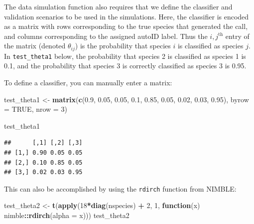 \documentclass[
]{article}
\newenvironment{Shaded}{\begin{snugshade}}{\end{snugshade}}
\newcommand{\AttributeTok}[1]{\textcolor[rgb]{0.13,0.29,0.53}{#1}}
\newcommand{\ConstantTok}[1]{\textcolor[rgb]{0.56,0.35,0.01}{#1}}
\newcommand{\ControlFlowTok}[1]{\textcolor[rgb]{0.13,0.29,0.53}{\textbf{#1}}}
\newcommand{\DecValTok}[1]{\textcolor[rgb]{0.00,0.00,0.81}{#1}}
\newcommand{\FloatTok}[1]{\textcolor[rgb]{0.00,0.00,0.81}{#1}}
\newcommand{\FunctionTok}[1]{\textcolor[rgb]{0.13,0.29,0.53}{\textbf{#1}}}
\newcommand{\NormalTok}[1]{#1}
\newcommand{\OtherTok}[1]{\textcolor[rgb]{0.56,0.35,0.01}{#1}}
\newcommand{\SpecialCharTok}[1]{\textcolor[rgb]{0.81,0.36,0.00}{\textbf{#1}}}
\begin{document}
\linespread{1}

The data simulation function also requires that we define the classifier and validation scenarios to be used in the simulations. Here, the classifier is encoded as a matrix with rows corresponding to the true species that generated the call, and columns corresponding to the assigned autoID label. Thus the \(i,j^\text{th}\) entry of the matrix (denoted \(\theta_{ij}\)) is the probability that species \(i\) is classified as species \(j.\) In \texttt{test\_theta1} below, the probability that species 2 is classified as species 1 is 0.1, and the probability that species 3 is correctly classified as species 3 is 0.95.

To define a classifier, you can manually enter a matrix:

\linespread{1}

\begin{Shaded}
\begin{Highlighting}[]
\NormalTok{test\_theta1 }\OtherTok{\textless{}{-}} \FunctionTok{matrix}\NormalTok{(}\FunctionTok{c}\NormalTok{(}\FloatTok{0.9}\NormalTok{, }\FloatTok{0.05}\NormalTok{, }\FloatTok{0.05}\NormalTok{,}
                       \FloatTok{0.1}\NormalTok{, }\FloatTok{0.85}\NormalTok{, }\FloatTok{0.05}\NormalTok{, }
                       \FloatTok{0.02}\NormalTok{, }\FloatTok{0.03}\NormalTok{, }\FloatTok{0.95}\NormalTok{), }\AttributeTok{byrow =} \ConstantTok{TRUE}\NormalTok{, }\AttributeTok{nrow =} \DecValTok{3}\NormalTok{)}

\NormalTok{test\_theta1}
\end{Highlighting}
\end{Shaded}

\begin{verbatim}
##      [,1] [,2] [,3]
## [1,] 0.90 0.05 0.05
## [2,] 0.10 0.85 0.05
## [3,] 0.02 0.03 0.95
\end{verbatim}

\linespread{1}

This can also be accomplished by using the \texttt{rdirch} function from NIMBLE:

\linespread{1}

\begin{Shaded}
\begin{Highlighting}[]
\NormalTok{test\_theta2 }\OtherTok{\textless{}{-}} \FunctionTok{t}\NormalTok{(}\FunctionTok{apply}\NormalTok{(}\DecValTok{18}\SpecialCharTok{*}\FunctionTok{diag}\NormalTok{(nspecies) }\SpecialCharTok{+} \DecValTok{2}\NormalTok{, }\DecValTok{1}\NormalTok{, }\ControlFlowTok{function}\NormalTok{(x) nimble}\SpecialCharTok{::}\FunctionTok{rdirch}\NormalTok{(}\AttributeTok{alpha =}\NormalTok{ x)))}
\NormalTok{test\_theta2}
\end{Highlighting}
\end{Shaded}
\end{document}
